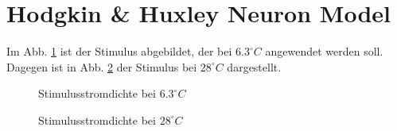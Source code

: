 \documentclass[conference]{IEEEtran}
\begin{document}
\section{Hodgkin \& Huxley Neuron Model}
Im Abb. \ref{fig:Stiumulus6} ist der Stimulus abgebildet, der bei $6.3^\circ C$ angewendet werden soll. Dagegen ist in Abb. \ref{fig:Stiumulus28} der Stimulus bei $28^\circ C$ dargestellt.
\begin{figure}[h!]
  	\centering
    \scalebox{.6}{}
    \caption{Stimulusstromdichte bei $6.3^\circ C$}
    \label{fig:Stiumulus6}
\end{figure}
\begin{figure}[h!]
  	\centering
    \scalebox{.6}{}
    \caption{Stimulusstromdichte bei $28^\circ C$}
    \label{fig:Stiumulus28}
\end{figure}
\end{document}
